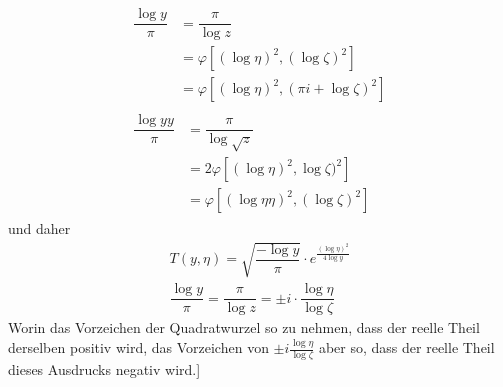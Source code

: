 \[
\begin{gathered}\begin{aligned}\dfrac{\log y}{\pi}&=\dfrac{\pi}{\log z}\\[7pt]&=\varphi[(\log\eta)^2,(\log\zeta)^2]\\[7pt]&=\varphi[(\log\eta)^2,(\pi i+\log\zeta)^2]\end{aligned}\\[10pt]\begin{aligned}\dfrac{\log yy}{\pi}&=\dfrac{\pi}{\log\surd  z}\\[7pt]&=2\varphi[(\log\eta)^2,\log\zeta)^2]\\[7pt]&=\varphi[(\log\eta\eta)^2,(\log\zeta)^2]\end{aligned}\end{gathered}
\]
und daher
\[
\begin{gathered}
T(y,\eta)=\surd {\dfrac{-\log y}{\pi}}\cdot e^{\frac{(\log\eta)^2}{4\log y}}\\[7pt]
\dfrac{\log y}{\pi}=\dfrac{\pi}{\log z}=\mathbin{\pm}i\cdot\dfrac{\log\eta}{\log\zeta}
\end{gathered}
\]
Worin das Vorzeichen der Quadratwurzel so zu nehmen, dass der reelle Theil derselben positiv wird, das Vorzeichen von $\mathbin{\pm}i\frac{\log\eta}{\log\zeta}$ aber so, dass der reelle Theil dieses Ausdrucks negativ wird.]

